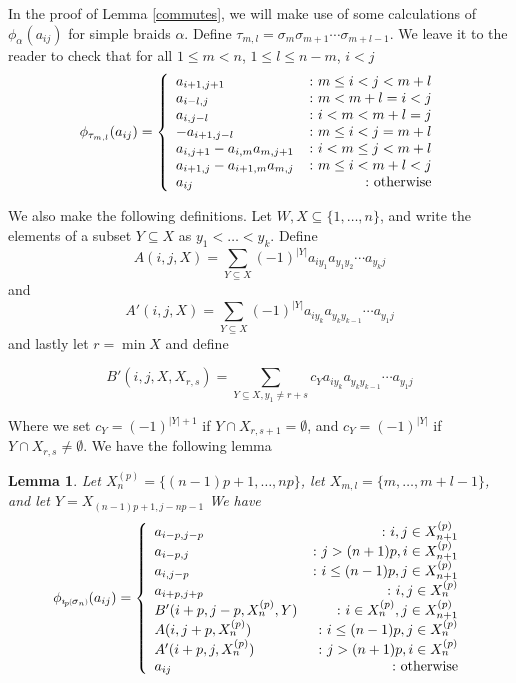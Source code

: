 \documentclass[11pt]{amsart}
\def\s{{\sigma}}
\newcommand*{\subsmallp}[1]{\scalebox{.5}{\ensuremath#1}}
\newcommand{\subpp}[2][p]{\imath_{\hspace*{-1pt}#1}\hspace*{-.5pt}\subsmallp(#2\subsmallp)}
\newtheorem{lem}[thm]{Lemma}
\theoremstyle{definition}
\begin{document}
In the proof of Lemma \ref{commutes}, we will make use of some calculations of $\phi_\alpha(a_{ij})$ for simple braids $\alpha$.  Define $\tau_{m,l} = \s_m\s_{m+1}\cdots\s_{m+l-1}$.  We leave it to the reader to check that for all $1\le m < n$, $1\le l \le n - m$, $i<j$
\begin{equation}\label{tau}
\phi_{\tau_{m,l}}(a_{ij}) =
\left\{
     \begin{array}{lr}
       a_{i+1,j+1} & \colon m\le i<j< m+l\\
       a_{i-l,j} & \colon m<m+l=i<j\\
       a_{i,j-l} & \colon i<m<m+l=j\\
       -a_{i+1,j-l} & \colon m\le i < j = m+l\\
       a_{i,j+1}-a_{i,m}a_{m,j+1} & \colon i<m\le j< m+l\\
       a_{i+1,j}-a_{i+1,m}a_{m,j} & \colon m\le i< m+l<j\\
       a_{ij} & \colon \textnormal{otherwise}
     \end{array}
\right.
\end{equation}

\noindent We also make the following definitions.  Let $W,X\subseteq \{1,\ldots,n\}$, and write the elements of a subset $Y\subseteq X$ as $y_1<\ldots <y_k$.  Define
$$
 A(i,j,X) = \sum_{Y\subseteq X}(-1)^{|Y|}a_{iy_1}a_{y_1y_2}\cdots a_{y_kj}
$$
and
$$
 A'(i,j,X) = \sum_{Y\subseteq X}(-1)^{|Y|}a_{iy_k}a_{y_ky_{k-1}}\cdots a_{y_1j}
$$
and lastly let $r = \min{X}$ and define

$$
B'(i,j,X,X_{r,s}) = \sum_{Y\subseteq X, y_1\ne r+s}c_Ya_{iy_k}a_{y_ky_{k-1}}\cdots a_{y_1j}
$$

\noindent Where we set $c_Y = (-1)^{|Y|+1}$ if $Y\cap X_{r,s+1} = \emptyset$, and $c_Y = (-1)^{|Y|}$ if $Y\cap X_{r,s}\ne\emptyset$.  We have the following lemma

\begin{lem}\label{Sigma_n}
Let $X_n^{(p)} = \{(n-1)p+1,\ldots,np\}$, let $X_{m,l} = \{m,\ldots,m+l-1\}$,  and let $Y = X_{(n-1)p+1,j-np-1}$  We have
$$
\phi_{\subpp{\s_n}}(a_{ij}) =
\left\{
     \begin{array}{lr}
       a_{i-p,j-p} & \colon i,j\in X_{n+1}^{(p)}\\
       a_{i-p,j} &\colon j > (n+1)p, i\in X_{n+1}^{(p)}\\
       a_{i,j-p} & \colon i\le(n-1)p, j\in X_{n+1}^{(p)}\\
       a_{i+p,j+p} &\colon i,j\in X_n^{(p)}\\
       B'(i+p,j-p,X_n^{(p)},Y) & \colon i\in X_n^{(p)}, j\in X_{n+1}^{(p)}\\
       A(i,j+p,X_n^{(p)}) & \colon i\le(n-1)p, j\in X_n^{(p)}\\
       A'(i+p,j,X_n^{(p)}) & \colon j> (n+1)p, i\in X_n^{(p)}\\
       a_{ij} & \colon \textnormal{otherwise}
     \end{array}
\right.
$$
\end{lem}
\end{document}

